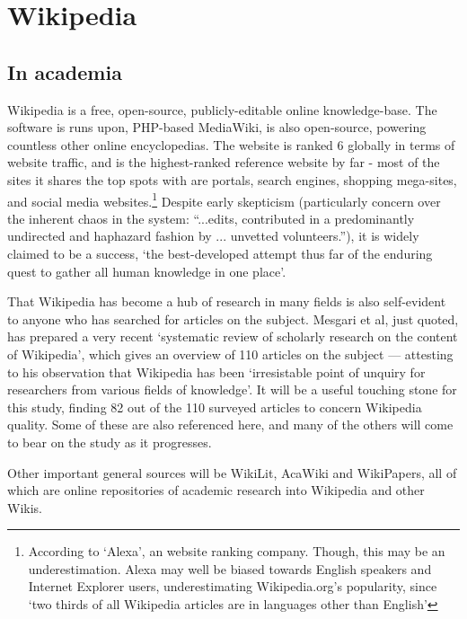 \section{Wikipedia}
\subsection*{In academia}
Wikipedia is a free, open-source, publicly-editable online
knowledge-base. The software is runs upon, PHP-based MediaWiki, is
also open-source, powering countless other online encyclopedias. The
website is ranked 6 globally in terms of website traffic,
and is the highest-ranked reference website by far - most of the sites
it shares the top spots with are portals, search engines, shopping
mega-sites, and social media websites.\footnote{According to `Alexa',
  an website ranking company.\cite{Alexa-about2014} Though, this may
  be an underestimation. Alexa may well be biased towards English
  speakers and Internet Explorer users, underestimating
  Wikipedia.org's popularity, since `two thirds of all Wikipedia
  articles are in languages other than
  English'\cite{wikimedia-noteonalexa}} Despite early skepticism
(particularly concern over the inherent chaos in the system:
``...edits, contributed in a predominantly undirected and haphazard
fashion by ... unvetted volunteers.''\cite{Wilkinson2007}), it is
widely claimed to be a success, `the best-developed attempt thus far
of the enduring quest to gather all human knowledge in one
place'\cite{Mesgari2014}.

That Wikipedia has become a hub of research in many fields is also
self-evident to anyone who has searched for articles on the
subject. Mesgari et al, just quoted, has prepared a very recent
`systematic review of scholarly research on the content of Wikipedia',
which gives an overview of 110 articles on the subject --- attesting
to his observation that Wikipedia has been `irresistable point of
unquiry for researchers from various fields of knowledge'. It will be
a useful touching stone for this study, finding 82 out of the 110
surveyed articles to concern Wikipedia quality. Some of these are also
referenced here, and many of the others will come to bear on the study
as it progresses.

Other important general sources will be WikiLit,\cite{wikilit}
AcaWiki\cite{acawiki} and WikiPapers\cite{wikipapers}, all of which
are online repositories of academic research into Wikipedia and other
Wikis.

